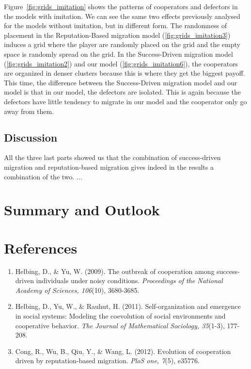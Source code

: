 \documentclass[11pt]{article}
\begin{document}
Figure~\ref{fig:grids_imitation} shows the patterns of cooperators and defectors in the models with imitation. We can see the same two effects previously analysed for the models without imitation, but in different form.
The randomness of placement in the Reputation-Based migration model (\ref{fig:grids_imitation3}) induces a grid where the player are randomly placed on the grid and the empty space is randomly spread on the grid. In the Success-Driven migration model (\ref{fig:grids_imitation2}) and our model (\ref{fig:grids_imitation6}), the cooperators are organized in denser clusters because this is where they get the biggest payoff.
This time, the difference between the Success-Driven migration model and our model is that in our model, the defectors are isolated. This is again because the defectors have little tendency to migrate in our model and the cooperator only go away from them.

\subsection{Discussion}

All the three last parts showed us that the combination of success-driven migration and reputation-based migration gives indeed in the results a combination of the two. ... %



\section{Summary and Outlook}

\section{References}

\begin{enumerate}
\item Helbing, D., \& Yu, W. (2009). The outbreak of cooperation among success-driven individuals under noisy conditions. \textit{Proceedings of the National Academy of Sciences, 106}(10), 3680-3685.
\item Helbing, D., Yu, W., \& Rauhut, H. (2011). Self-organization and emergence in social systems: Modeling the coevolution of social environments and cooperative behavior. \textit{The Journal of Mathematical Sociology, 35}(1-3), 177-208.
\item Cong, R., Wu, B., Qiu, Y., \& Wang, L. (2012). Evolution of cooperation driven by reputation-based migration. \textit{PloS one, 7}(5), e35776.
\end{enumerate}
\end{document}
